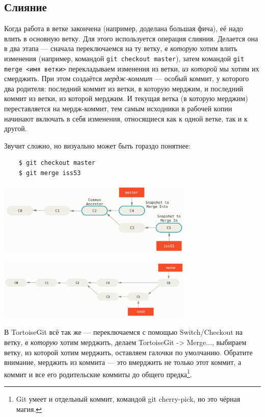 \documentclass{../text-style}
\begin{document}
\subsection{Слияние}

Когда работа в ветке закончена (например, доделана большая фича), её надо влить в основную ветку. Для этого используется операция слияния. Делается она в два этапа --- сначала переключаемся на ту ветку, \emph{в которую} хотим влить изменения (например, командой \verb|git checkout master|), затем командой \verb|git merge <имя ветки>| перекладываем изменения из ветки, \emph{из которой} мы хотим их смерджить. При этом создаётся \emph{мердж-коммит} --- особый коммит, у которого два родителя: последний коммит из ветки, в которую мерджим, и последний коммит из ветки, из которой мерджим. И текущая ветка (в которую мерджим) переставляется на мердж-коммит, тем самым исходники в рабочей копии начинают включать в себя изменения, относящиеся как к одной ветке, так и к другой. 

Звучит сложно, но визуально может быть гораздо понятнее:

\begin{verbatim}
    $ git checkout master
    $ git merge iss53
\end{verbatim}
\begin{center}
    \includegraphics[width=0.7\textwidth]{merge.png}
\end{center}
\begin{center}
    \includegraphics[width=0.7\textwidth]{mergeResult.png}
\end{center}

В TortoiseGit всё так же --- переключаемся с помощью Switch/Checkout на ветку, \emph{в которую} хотим мерджить, делаем TortoiseGit -> Merge..., выбираем ветку, из которой хотим мерджить, оставляем галочки по умолчанию. Обратите внимание, мерджить из коммита --- это вмерджить не только этот коммит, а коммит и все его родительские коммиты до общего предка\footnote{Git умеет и отдельный коммит, командой git cherry-pick, но это чёрная магия.}.
\end{document}
